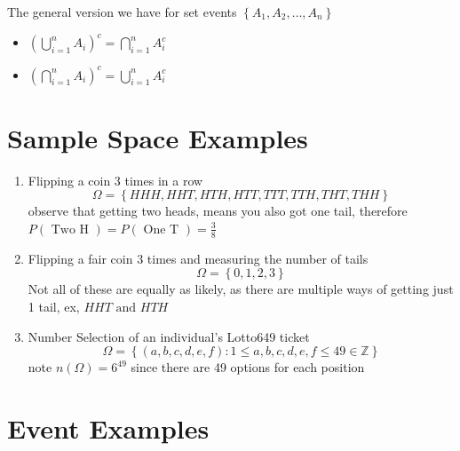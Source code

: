 \documentclass[11pt]{book}
\begin{document}
\begin{itemize}
\begin{center}
        \end{center}
    The general version we have for set events  $\left\{ A_{1} , A_{2} , \ldots , A_{n}  \right\} $ 
    \begin{itemize}
        \item $\left( \bigcup_{i= 1}^{n} A_{i}  \right) ^{c} = \bigcap_{i=1}^{n} A_{i} ^{c} $ 
        \item $\left( \bigcap_{i=1}^{n} A_{i}  \right) ^{c} = \bigcup_{i=1}^{n} A_{i} ^{c} $ 
    \end{itemize}
\end{itemize}


\section{Sample Space Examples}%
\label{sec:sample_space_examples}

\begin{enumerate}
    \item Flipping a coin 3 times in a row
        \[
        \Omega = \left\{ HHH, HHT, HTH, HTT, TTT, TTH, THT, THH \right\}  
        \]
        observe that getting two heads, means you also got one tail, therefore $P\left(\text{ Two H } \right) = P\left(\text{ One T } \right) = \frac{3}{8}$ 
    \item Flipping a fair coin 3 times and measuring the number of tails
        \[
        \Omega = \left\{ 0, 1, 2, 3 \right\} 
        \]
        Not all of these are equally as likely, as there are multiple ways of getting just 1 tail, ex, $HHT \text{ and } HTH$ 
    \item Number Selection of an individual's Lotto649 ticket
        \[
            \Omega = \left\{ \left( a,b,c,d,e,f \right) : 1 \le a,b,c,d,e,f \le 49 \in \mathbb{Z}  \right\} 
        \]
        note $n\left(\Omega \right) = 6^{49} $ since there are 49 options for each position
\end{enumerate}


\section{Event Examples}%
\label{sec:event_examples}
\end{document}

